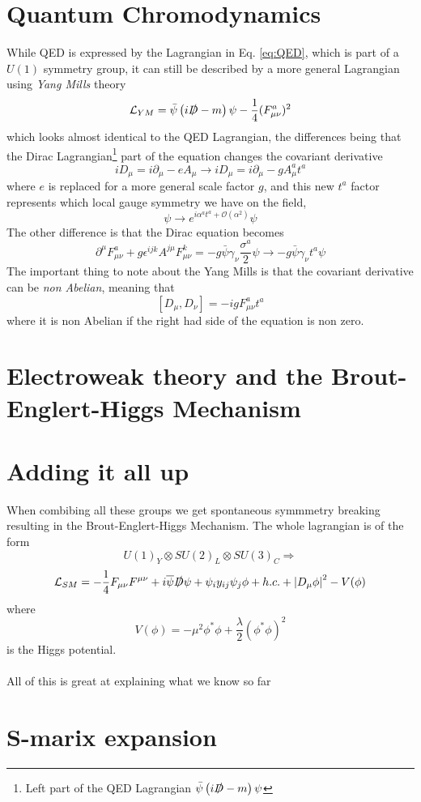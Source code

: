 \documentclass[12pt, a4paper]{book}
\begin{document}
\section{Quantum Chromodynamics}
While QED is expressed by the Lagrangian in Eq. \ref{eq:QED}, which is part of a $U(1)$ symmetry group, it can still be described by a more general Lagrangian using \textit{Yang Mills} theory
\begin{equation}\label{eq:YM_lag}
    \mathcal{L}_{YM} = \bar{\psi}\left(i\slashed{D} -m\right)\psi -\frac{1}{4}(F^a_{\mu\nu})^2
\end{equation}
which looks almost identical to the QED Lagrangian, the differences being that the Dirac Lagrangian\footnote{Left part of the QED Lagrangian $ \bar{\psi}\left(i\slashed{D} -m\right)\psi $} part of the equation changes the covariant derivative
$$
iD_\mu = i\partial_\mu -eA_\mu\rightarrow iD_\mu = i\partial_\mu -gA^a_\mu t^a
$$
where $e$ is replaced for a more general scale factor $g$, and this new $t^a$ factor represents which local gauge symmetry we have on the field,
$$
\psi \rightarrow e^{i \alpha^a t^a + \mathcal{O}(\alpha^2)} \psi
$$ 
The other difference is that the Dirac equation becomes
\begin{equation}\label{eq:YM_eq}
    \partial^\mu F^a_{\mu\nu} +g\epsilon^{ijk}A^{j\mu}F^k_{\mu\nu} = -g\bar{\psi}\gamma_\nu\frac{\sigma^a}{2}\psi \rightarrow -g\bar{\psi}\gamma_\nu t^a\psi
\end{equation}
The important thing to note about the Yang Mills is that the covariant derivative can be \textit{non Abelian}, meaning that 
$$
\left[D_\mu,D_\nu\right] = -igF_{\mu\nu}^at^a
$$
where it is non Abelian if the right had side of the equation is non zero. 
\section{Electroweak theory and the Brout-Englert-Higgs Mechanism}
\section{Adding it all up}
When combibing all these groups we get spontaneous symmmetry breaking resulting in the Brout-Englert-Higgs Mechanism. The whole lagrangian is of the form
$$
U(1)_Y\otimes SU(2)_L\otimes SU(3)_C \Rightarrow 
$$
\begin{equation}
    \mathcal{L}_{SM} = -\frac{1}{4}F_{\mu\nu}F^{\mu\nu} + i\overline{\psi}\slashed{D}\psi + \psi_iy_{ij}\psi_j\phi + h.c. + \abs{D_\mu\phi}^2 - V(\phi)
\end{equation}
where 
$$
V(\phi)=-\mu^2\phi^*\phi + \frac{\lambda}{2}(\phi^*\phi)^2
$$
is the Higgs potential.\\
\\All of this is great at explaining what we know so far
\section{S-marix expansion}
\end{document}
